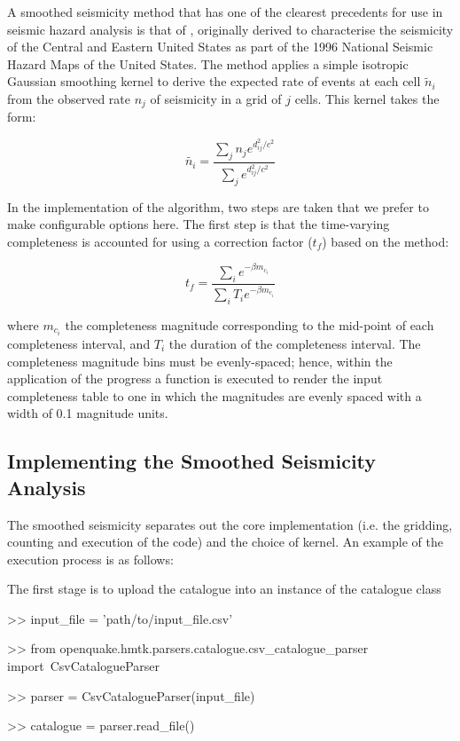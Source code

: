 A smoothed seismicity method that has one of the clearest precedents for use in seismic hazard analysis is that of \textcite{frankel1995}, originally derived to characterise the seismicity of the Central and Eastern United States as part of the 1996 National Seismic Hazard Maps of the United States. The method applies a simple isotropic Gaussian smoothing kernel to derive the expected rate of events at each cell $\tilde{n}_i$ from the observed rate $n_j$ of seismicity in a grid of $j$ cells. This kernel takes the form:

\begin{equation}
\tilde{n_i} = \frac{\sum_j n_j e^{d_{ij}^2 / c^2}}{\sum_j e^{d_{ij}^2 / c^2}} 
\end{equation}

In the implementation of the algorithm, two steps are taken that we prefer to make configurable options here. The first step is that the time-varying completeness is accounted for using a correction factor ($t_f$) based on the \textcite{Weichert1980} method:

 \begin{equation}
 t_f = \frac{\sum_i e^{-\beta m_{c_i}}}{\sum_i T_i e^{-\beta m_{c_i}}} 
 \end{equation}
 
where $m_{c_i}$ the completeness magnitude corresponding to the mid-point of each completeness interval, and $T_i$ the duration of the completeness interval. The completeness magnitude bins must be evenly-spaced; hence, within the application of the progress a function is executed to render the input completeness table to one in which the magnitudes are evenly spaced with a width of 0.1 magnitude units. 

\subsection{Implementing the Smoothed Seismicity Analysis}

The smoothed seismicity separates out the core implementation (i.e. the gridding, counting and execution of the code) and the choice of kernel. An example of the execution process is as follows:

The first stage is to upload the catalogue into an instance of the catalogue class

\begin{python}[frame=single]
>> input_file = 'path/to/input_file.csv'

>> from openquake.hmtk.parsers.catalogue.csv_catalogue_parser import\
    CsvCatalogueParser

>> parser = CsvCatalogueParser(input_file)

>> catalogue = parser.read_file()
\end{python}

